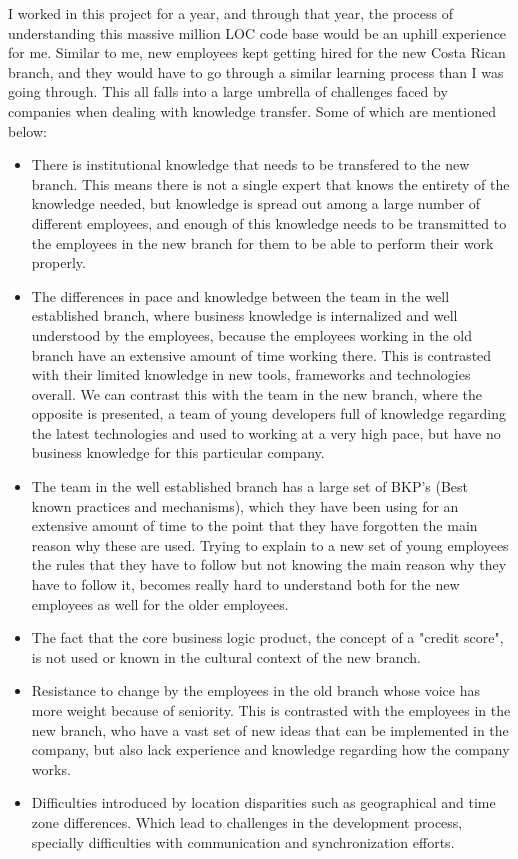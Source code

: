 \documentclass[12pt, letterpaper]{article}
\begin{document}
I worked in this project for a year, and through that year, the process of understanding this massive million LOC 
code base would be an uphill experience for me. Similar to me, new employees kept getting hired for the new Costa Rican 
branch, and they would have to go through a similar learning process than I was going through. This all falls into a large
umbrella of challenges faced by companies when dealing with knowledge transfer. Some of which are mentioned below:

\begin{itemize}
  \item There is institutional knowledge that needs to be transfered to the new branch. This means there is not a single expert that 
  knows the entirety of the knowledge needed, but knowledge is spread out among a 
large number of different employees, and enough of this knowledge needs to be transmitted to the employees in the new 
branch for them to be able to perform their work properly.
  \item The differences in pace and knowledge between the team in the well established branch, where  
  business knowledge is internalized and well understood by the employees, because the employees working in the old branch have an extensive amount of time working there. This is contrasted with their limited knowledge in new tools, 
  frameworks and technologies overall. We can contrast this with the team in the new branch, where the opposite is
  presented, a team of young developers full of knowledge regarding the latest technologies and used to working at a 
  very high pace, but have no business knowledge for this particular company. 
  \item The team in the well established branch has a large set of BKP's (Best known practices and mechanisms), 
  which they have been using for an extensive amount of time to the point that they have forgotten the main reason
  why these are used. Trying to explain to a new set of young employees the rules that they have to follow but not
  knowing the main reason why they have to follow it, becomes really hard to understand both for the new employees
  as well for the older employees.
  \item The fact that the core business logic product, the concept of a "credit score", is not used or known in the 
cultural context of the new branch.
  \item Resistance to change by the employees in the old branch whose voice has more weight
  because of seniority. This is contrasted with the employees in the new branch, who have a vast set of new ideas 
  that can be implemented in the company, but also lack experience and knowledge regarding how the company works.
  \item Difficulties introduced by location disparities such as geographical and time zone differences. Which lead to 
  challenges in the development process, specially difficulties with communication and synchronization efforts.
\end{itemize}
\end{document}
